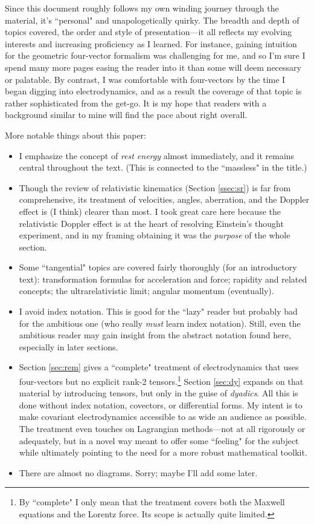\documentclass[12pt]{article}
\begin{document}
Since this document roughly follows my own winding journey through the material, it's ``personal" and unapologetically quirky. The breadth and depth of topics covered, the order and style of presentation---it all reflects my evolving interests and increasing proficiency as I learned. For instance, gaining intuition for the geometric four-vector formalism was challenging for me, and so I'm sure I spend many more pages easing the reader into it than some will deem necessary or palatable. By contrast, I was comfortable with four-vectors by the time I began digging into electrodynamics, and as a result the coverage of that topic is rather sophisticated from the get-go. It is my hope that readers with a background similar to mine will find the pace about right overall.

More notable things about this paper:
\begin{itemize}
\item I emphasize the concept of \emph{rest energy} almost immediately, and it remains central throughout the text. (This is connected to the ``massless" in the title.)
\item Though the review of relativistic kinematics (Section \ref{ssec:sr}) is far from comprehensive, its treatment of velocities, angles, aberration, and the Doppler effect is (I think) clearer than most. I took great care here because the relativistic Doppler effect is at the heart of resolving Einstein's thought experiment, and in my framing obtaining it was the \emph{purpose} of the whole section.
\item Some ``tangential" topics are covered fairly thoroughly (for an introductory text): transformation formulas for acceleration and force; rapidity and related concepts; the ultrarelativistic limit; angular momentum (eventually).
\item I avoid index notation. This is good for the ``lazy" reader but probably bad for the ambitious one (who really \emph{must} learn index notation). Still, even the ambitious reader may gain insight from the abstract notation found here, especially in later sections.
\item Section \ref{sec:rem} gives a ``complete" treatment of electrodynamics that uses four-vectors but no explicit rank-2 tensors.\footnote{By ``complete" I only mean that the treatment covers both the Maxwell equations and the Lorentz force. Its scope is actually quite limited.} Section \ref{sec:dy} expands on that material by introducing tensors, but only in the guise of \emph{dyadics}. All this is done without index notation, covectors, or differential forms. My intent is to make covariant electrodynamics accessible to as wide an audience as possible. The treatment even touches on Lagrangian methods---not at all rigorously or adequately, but in a novel way meant to offer some ``feeling" for the subject while ultimately pointing to the need for a more robust mathematical toolkit.
\item There are almost no diagrams. Sorry; maybe I'll add some later.
\end{itemize}
\end{document}

